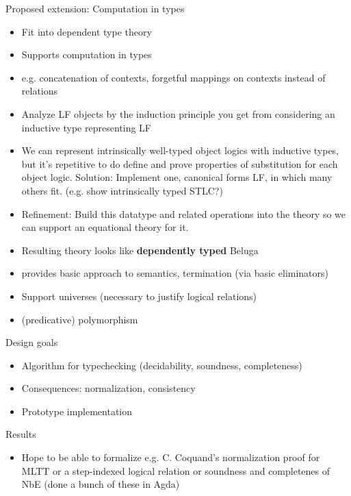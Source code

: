 \documentclass[usenames,dvipsnames]{beamer}
\begin{document}
\begin{frame}{Proposed extension: Computation in types}
\begin{itemize}
\item Fit into dependent type theory
\item Supports computation in types
\item e.g. concatenation of contexts, forgetful mappings on contexts instead of relations
\item Analyze LF objects by the induction principle you get from considering an inductive type representing LF
\item We can represent intrinsically well-typed object logics with inductive types, but it's repetitive to do define and prove properties of substitution for each object logic. Solution: Implement one, canonical forms LF, in which many others fit. (e.g. show intrinsically typed STLC?)
\item Refinement: Build this datatype and related operations into the theory so we can support an equational theory for it.
\item Resulting theory looks like \textbf{dependently typed} Beluga
\item provides basic approach to semantics, termination (via basic eliminators)
\item Support universes (necessary to justify logical relations)
\item (predicative) polymorphism
\end{itemize}
\end{frame}

\begin{frame}{Design goals}
\begin{itemize}
\item Algorithm for typechecking (decidability, soundness, completeness)
\item Consequences: normalization, consistency
\item Prototype implementation
\end{itemize}
\end{frame}

\begin{frame}{Results}
\begin{itemize}
\item Hope to be able to formalize e.g. C. Coquand's normalization proof for MLTT or a step-indexed logical relation or soundness and completenes of NbE (done a bunch of these in Agda)
\end{itemize}
\end{frame}
\end{document}
